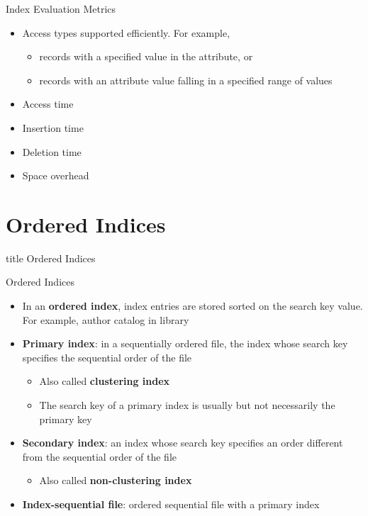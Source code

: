 \documentclass[aspectratio=169, xcolor=dvipsnames]{beamer}
\begin{document}
\begin{frame}{Index Evaluation Metrics}
    \begin{itemize}[<+->]
        \item Access types supported efficiently. For example,
        \begin{itemize}[<+->]
            \item records with a specified value in the attribute, or
            \item records with an attribute value falling in a specified range of values
        \end{itemize}
        \item Access time
        \item Insertion time
        \item Deletion time
        \item Space overhead
    \end{itemize}
\end{frame}

\section{Ordered Indices}
\begin{frame}
  \vfill
  \centering
  \begin{beamercolorbox}[sep=8pt,center,shadow=true,rounded=true]{title}
    Ordered Indices\par%
  \end{beamercolorbox}
  \vfill
\end{frame}

\begin{frame}{Ordered Indices}
    \begin{itemize}[<+->]
        \item In an \textbf{ordered index}, index entries are stored sorted on the search key value. For example, author catalog in library
        \item \textbf{Primary index}: in a sequentially ordered file, the index whose search key specifies the sequential order of the file
        \begin{itemize}[<+->]
            \item Also called \textbf{clustering index}
            \item The search key of a primary index is usually but not necessarily the primary key
        \end{itemize}
        \item \textbf{Secondary index}: an index whose search key specifies an order different from the sequential order of the file
        \begin{itemize}[<+->]
            \item Also called \textbf{non-clustering index}
        \end{itemize}
        \item \textbf{Index-sequential file}: ordered sequential file with a primary index
    \end{itemize}
\end{frame}
\end{document}
